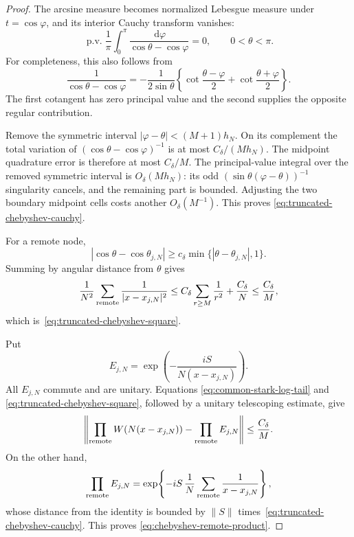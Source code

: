 \documentclass[11pt]{article}
\theoremstyle{remark}
\newcommand{\dd}{\,\mathrm d}
\begin{document}
\begin{proof}
The arcsine measure becomes normalized Lebesgue measure under
$t=\cos\varphi$, and its interior Cauchy transform vanishes:
\begin{equation}
 \operatorname{p.v.}\frac1\pi\int_0^\pi
 \frac{\dd\varphi}{\cos\theta-\cos\varphi}=0,
 \qquad 0<\theta<\pi.
 \label{eq:arcsine-zero-cauchy-transform}
\end{equation}
For completeness, this also follows from
\[
 \frac1{\cos\theta-\cos\varphi}
 =
 -\frac1{2\sin\theta}
 \left\{
  \cot\frac{\theta-\varphi}{2}
  +\cot\frac{\theta+\varphi}{2}
 \right\}.
\]
The first cotangent has zero principal value and the second supplies the
opposite regular contribution.

Remove the symmetric interval
$|\varphi-\theta|<(M+1)h_N$.  On its complement the total variation of
$(\cos\theta-\cos\varphi)^{-1}$ is at most
$C_\delta/(Mh_N)$.  The midpoint quadrature error is therefore at most
$C_\delta/M$.  The principal-value integral over the removed symmetric
interval is $O_\delta(Mh_N)$: its odd
$(\sin\theta(\varphi-\theta))^{-1}$ singularity cancels, and the remaining
part is bounded.  Adjusting the two boundary midpoint cells costs another
$O_\delta(M^{-1})$.  This proves
\eqref{eq:truncated-chebyshev-cauchy}.

For a remote node,
\[
 |\cos\theta-\cos\theta_{j,N}|
 \geq c_\delta\min\{|\theta-\theta_{j,N}|,1\}.
\]
Summing by angular distance from $\theta$ gives
\[
 \frac1{N^2}\sum_{\rm remote}
 \frac1{|x-x_{j,N}|^2}
 \leq
 C_\delta\sum_{r\geq M}\frac1{r^2}
 +\frac{C_\delta}{N}
 \leq\frac{C_\delta}{M},
\]
which is~\eqref{eq:truncated-chebyshev-square}.

Put
\[
 E_{j,N}
 =\exp\!\left(-\frac{iS}{N(x-x_{j,N})}\right).
\]
All $E_{j,N}$ commute and are unitary.  Equations
\eqref{eq:common-stark-log-tail} and
\eqref{eq:truncated-chebyshev-square}, followed by a unitary telescoping
estimate, give
\[
 \left\|\prod_{\rm remote}W\!\left(N(x-x_{j,N})\right)
       -\prod_{\rm remote}E_{j,N}\right\|
 \leq\frac{C_\delta}{M}.
\]
On the other hand,
\[
 \prod_{\rm remote}E_{j,N}
 =
 \exp\!\left\{
  -iS\,\frac1N\sum_{\rm remote}\frac1{x-x_{j,N}}
 \right\},
\]
whose distance from the identity is bounded by
$\|S\|$ times~\eqref{eq:truncated-chebyshev-cauchy}.  This proves
\eqref{eq:chebyshev-remote-product}.
\end{proof}
\end{document}
